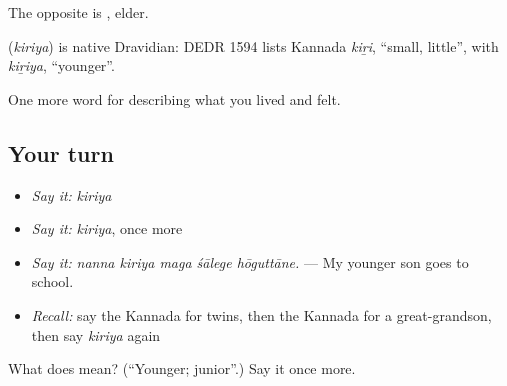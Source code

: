 The opposite is , elder.

\begin{cousinweb}
\textbf{} (\emph{kiriya}) is native Dravidian: DEDR 1594 lists Kannada \emph{kiṟi}, \textquotedblleft{}small, little\textquotedblright{}, with \emph{kiṟiya}, \textquotedblleft{}younger\textquotedblright{}.
\end{cousinweb}

\begin{grammarlens}[title={What you've built}]
One more word for describing what you lived and felt.
\end{grammarlens}

\subsection*{Your turn}
\begin{itemize}
\raggedright
  \item \emph{Say it:} \emph{kiriya}
  \item \emph{Say it:} \emph{kiriya}, once more
  \item \emph{Say it:} \emph{nanna kiriya maga śālege hōguttāne.} — My younger son goes to school.
  \item \emph{Recall:} say the Kannada for twins, then the Kannada for a great-grandson, then say \emph{kiriya} again
\end{itemize}

\begin{tcolorbox}[breakable,colback=teal!4,colframe=teal!35!black,title={Before you move on}]
What does  mean? (\textquotedblleft{}Younger; junior\textquotedblright{}.) Say it once more.
\end{tcolorbox}
